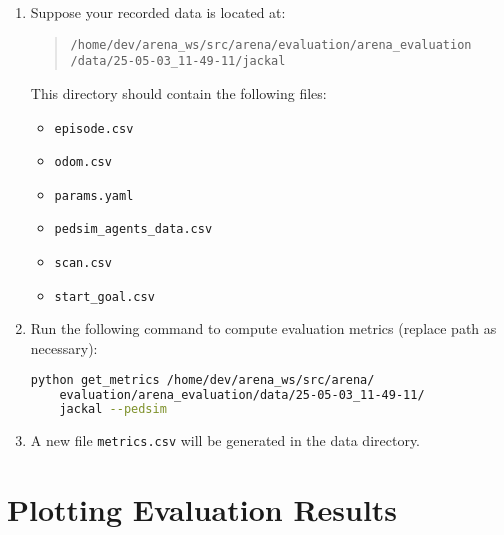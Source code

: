 \begin{enumerate}
  \item Suppose your recorded data is located at:
  
  \begin{quote}
    \texttt{/home/dev/arena\_ws/src/arena/evaluation/arena\_evaluation \\
    /data/25-05-03\_11-49-11/jackal}
  \end{quote}

  This directory should contain the following files:
  \begin{itemize}
    \item \texttt{episode.csv}
    \item \texttt{odom.csv}
    \item \texttt{params.yaml}
    \item \texttt{pedsim\_agents\_data.csv}
    \item \texttt{scan.csv}
    \item \texttt{start\_goal.csv}
  \end{itemize}

  \item Run the following command to compute evaluation metrics (replace path as necessary):

  \begin{lstlisting}[language=bash]
    python get_metrics /home/dev/arena_ws/src/arena/
    evaluation/arena_evaluation/data/25-05-03_11-49-11/
    jackal --pedsim
  \end{lstlisting}

  \item A new file \texttt{metrics.csv} will be generated in the data directory.
\end{enumerate}


\section{Plotting Evaluation Results}


